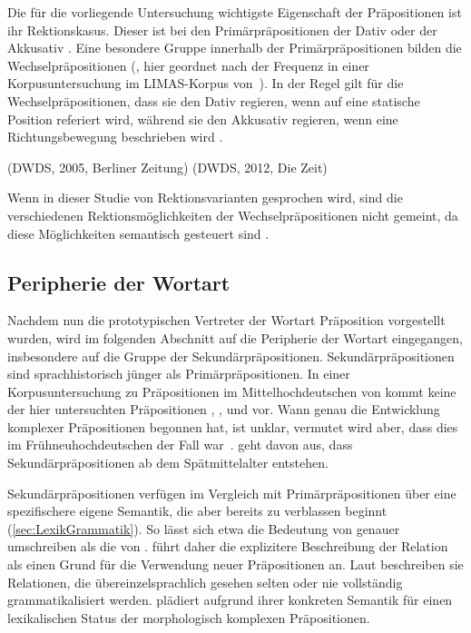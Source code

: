 Die für die vorliegende Untersuchung wichtigste Eigenschaft der Präpositionen ist ihr Rektionskasus. 
Dieser ist bei den Primärpräpositionen der Dativ oder der Akkusativ \citep[s.][94]{Szczepaniak2011}. 
Eine besondere Gruppe innerhalb der Primärpräpositionen bilden die Wechselpräpositionen  (\citealp[s.][§912--913]{Duden2016}, hier geordnet nach der Frequenz in einer Korpusuntersuchung im LIMAS-Korpus von~\citealp[19]{Folsom1984}). 
In der Regel gilt für die Wechselpräpositionen, dass sie den Dativ regieren, wenn auf eine statische Position referiert wird, während sie den Akkusativ regieren, wenn eine Richtungsbewegung beschrieben wird \citep[s.][§912]{Duden2016}. 
\begin{exe}
\ex {} (DWDS, 2005, Berliner Zeitung) 
\ex {} (DWDS, 2012, Die Zeit)
\end{exe}
Wenn in dieser Studie von Rektionsvarianten gesprochen wird, sind die verschiedenen Rektionsmöglichkeiten der Wechselpräpositionen nicht gemeint, da diese Möglichkeiten semantisch gesteuert sind \citep[s.][703]{Engel1988}.
\subsection{Peripherie der Wortart}
\label{sec:Sekundaer}
Nachdem nun die prototypischen Vertreter der Wortart Präposition vorgestellt wurden, wird im folgenden Abschnitt auf die Peripherie der Wortart eingegangen, insbesondere auf die Gruppe der Sekundärpräpositionen. 
Sekundärpräpositionen sind sprachhistorisch jünger als Primärpräpositionen. 
In einer Korpusuntersuchung zu Präpositionen im Mittelhochdeutschen von \citet[]{Waldenberger.2009} kommt keine der hier untersuchten Pr{\"a}positionen , ,  und  vor. 
Wann genau die Entwicklung komplexer Pr{\"a}positionen begonnen hat, ist unklar, vermutet wird aber, dass dies im Fr{\"u}hneuhochdeutschen der Fall war~\citep[s.][50]{Meibauer1995}. 
\citet[43]{Romare.2004} geht davon aus, dass Sekundärpräpositionen ab dem Sp{\"a}tmittelalter entstehen. 

Sekundärpräpositionen verfügen im Vergleich mit Primärpräpositionen über eine spezifischere eigene Semantik, die aber bereits zu verblassen beginnt (\autoref{sec:LexikGrammatik}). 
So lässt sich etwa die Bedeutung von  genauer umschreiben als die von . 
\citet[42--43]{Bene.1975} f{\"u}hrt daher die explizitere Beschreibung der Relation als einen Grund f{\"u}r die Verwendung neuer Pr{\"a}positionen an. 
Laut \citet[67]{Diewald.1997} beschreiben sie Relationen, {\glqq}die übereinzelsprachlich gesehen selten oder nie vollst{\"a}ndig grammatikalisiert werden{\grqq}. 
\citet{Eisenberg1979} pl{\"a}diert aufgrund ihrer konkreten Semantik f{\"u}r einen lexikalischen Status der morphologisch komplexen Pr{\"a}positionen.

